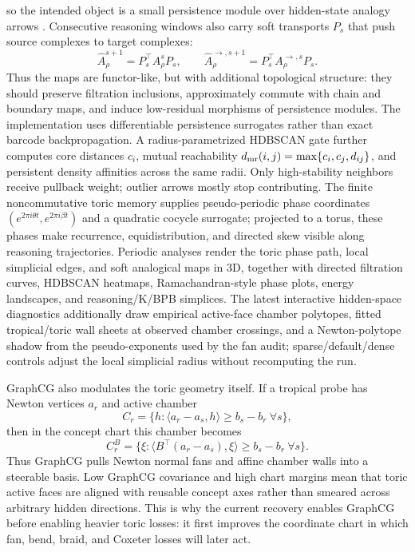 \documentclass[10pt]{article}
\theoremstyle{definition}
\theoremstyle{plain}
\theoremstyle{remark}
\begin{document}
so the intended object is a small persistence module over hidden-state analogy arrows \cite{edelsbrunner2002topological,zomorodian2005computing,cohensteiner2007stability}.  Consecutive reasoning windows also carry soft transports $P_s$ that push source complexes to target complexes:
\begin{equation}
  \widehat A_{\rho}^{s+1}=P_s^\top A_{\rho}^{s}P_s,\qquad
  \widehat A_{\rho}^{\rightarrow,s+1}=P_s^\top A_{\rho}^{\rightarrow,s}P_s .
\end{equation}
Thus the maps are functor-like, but with additional topological structure: they should preserve filtration inclusions, approximately commute with chain and boundary maps, and induce low-residual morphisms of persistence modules.  The implementation uses differentiable persistence surrogates rather than exact barcode backpropagation.  A radius-parametrized HDBSCAN gate further computes core distances $c_i$, mutual reachability $d_{\rm mr}(i,j)=\max\{c_i,c_j,d_{ij}\}$, and persistent density affinities across the same radii.  Only high-stability neighbors receive pullback weight; outlier arrows mostly stop contributing.  The finite noncommutative toric memory supplies pseudo-periodic phase coordinates $(e^{2\pi i\theta t},e^{2\pi i\beta t})$ and a quadratic cocycle surrogate; projected to a torus, these phases make recurrence, equidistribution, and directed skew visible along reasoning trajectories.  Periodic analyses render the toric phase path, local simplicial edges, and soft analogical maps in 3D, together with directed filtration curves, HDBSCAN heatmaps, Ramachandran-style phase plots, energy landscapes, and reasoning/K/BPB simplices.  The latest interactive hidden-space diagnostics additionally draw empirical active-face chamber polytopes, fitted tropical/toric wall sheets at observed chamber crossings, and a Newton-polytope shadow from the pseudo-exponents used by the fan audit; sparse/default/dense controls adjust the local simplicial radius without recomputing the run.

GraphCG also modulates the toric geometry itself.  If a tropical probe has Newton vertices $a_r$ and active chamber
\begin{equation}
  C_r=\{h:\langle a_r-a_s,h\rangle\ge b_s-b_r\ \forall s\},
\end{equation}
then in the concept chart this chamber becomes
\begin{equation}
  C_r^B=\{\xi:\langle B^\top(a_r-a_s),\xi\rangle\ge b_s-b_r\ \forall s\}.
\end{equation}
Thus GraphCG pulls Newton normal fans and affine chamber walls into a steerable basis.  Low GraphCG covariance and high chart margins mean that toric active faces are aligned with reusable concept axes rather than smeared across arbitrary hidden directions.  This is why the current recovery enables GraphCG before enabling heavier toric losses: it first improves the coordinate chart in which fan, bend, braid, and Coxeter losses will later act.
\end{document}
